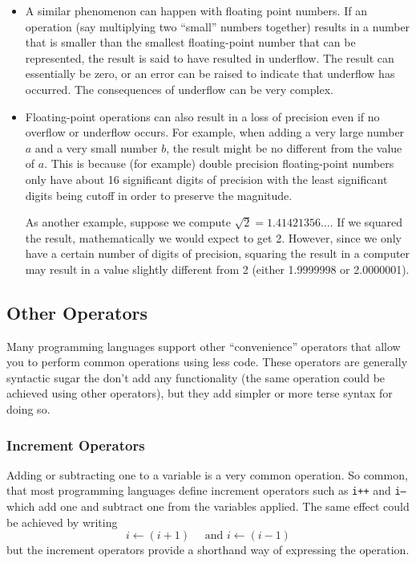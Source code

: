 \begin{itemize}
  \item A similar phenomenon can happen with floating point numbers.  If an operation
  (say multiplying two ``small'' numbers together) results in a number that is smaller
  than the smallest floating-point number that can be represented, the result is said
  to have resulted in \gls{underflow}.  The result can essentially be zero, or an error 
  can be raised to indicate that underflow has occurred.  The consequences of 
  underflow can be very complex.
  
  \item Floating-point operations can also result in a loss of precision even if no overflow
  or underflow occurs.  For example, when adding a very large number $a$ and a very small 
  number $b$, the result might be no different from the value of $a$.  This is because 
  (for example) double precision floating-point numbers only have about 16 significant 
  digits of precision with the least significant digits being cutoff in order to preserve the 
  magnitude.
  
  As another example, suppose we compute $\sqrt{2} = 1.41421356\ldots$.  If we
  squared the result, mathematically we would expect to get 2.  However, since we
  only have a certain number of digits of precision, squaring the result in a 
  computer may result in a value slightly different from 2 (either 1.9999998 or 2.0000001).

\end{itemize}

\subsection{Other Operators}

Many programming languages support other ``convenience'' operators that 
allow you to perform common operations using less code.  These operators
are generally \gls{syntactic sugar} the don't add any functionality (the same
operation could be achieved using other operators), but they add simpler or
more terse syntax for doing so.

\subsubsection{Increment Operators}
\label{subsubsection:incrementOperators}
 
Adding or subtracting one to a variable is a very common operation.  So common, 
that most programming languages define increment operators such as \texttt{i++} 
and \texttt{i--} which add one and subtract one from the variables applied.  
The same effect could be achieved by writing 
   $$i\leftarrow (i+1) \quad \text{ and } i \leftarrow (i-1)$$
but the increment operators provide a shorthand way of expressing the operation.

